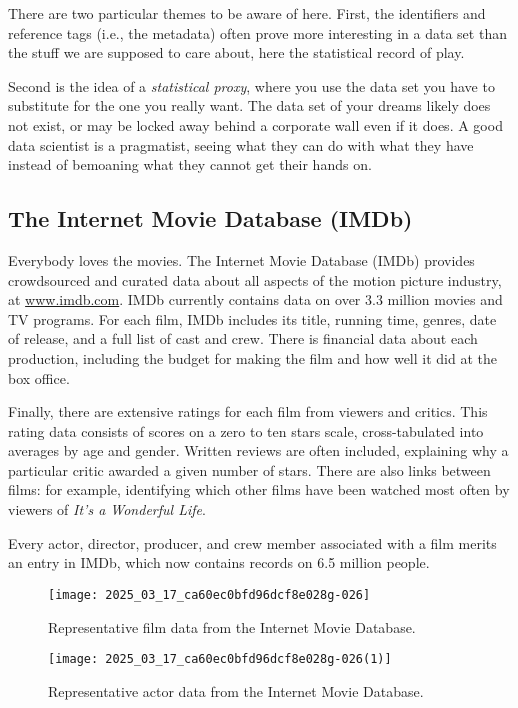 \documentclass[10pt]{article}
\begin{document}
There are two particular themes to be aware of here. First, the identifiers and reference tags (i.e., the metadata) often prove more interesting in a data set than the stuff we are supposed to care about, here the statistical record of play.

Second is the idea of a \textit{statistical proxy}, where you use the data set you have to substitute for the one you really want. The data set of your dreams likely does not exist, or may be locked away behind a corporate wall even if it does. A good data scientist is a pragmatist, seeing what they can do with what they have instead of bemoaning what they cannot get their hands on.

\subsection{The Internet Movie Database (IMDb)}
Everybody loves the movies. The Internet Movie Database (IMDb) provides crowdsourced and curated data about all aspects of the motion picture industry, at \href{http://www.imdb.com}{www.imdb.com}. IMDb currently contains data on over 3.3 million movies and TV programs. For each film, IMDb includes its title, running time, genres, date of release, and a full list of cast and crew. There is financial data about each production, including the budget for making the film and how well it did at the box office.

Finally, there are extensive ratings for each film from viewers and critics. This rating data consists of scores on a zero to ten stars scale, cross-tabulated into averages by age and gender. Written reviews are often included, explaining why a particular critic awarded a given number of stars. There are also links between films: for example, identifying which other films have been watched most often by viewers of \textit{It's a Wonderful Life}.

Every actor, director, producer, and crew member associated with a film merits an entry in IMDb, which now contains records on 6.5 million people.

\begin{figure}[h]
\centering
\texttt{[image: 2025\_03\_17\_ca60ec0bfd96dcf8e028g-026]}
\caption{Representative film data from the Internet Movie Database.}
\end{figure}

\begin{figure}[h]
\centering
\texttt{[image: 2025\_03\_17\_ca60ec0bfd96dcf8e028g-026(1)]}
\caption{Representative actor data from the Internet Movie Database.}
\end{figure}
\end{document}
